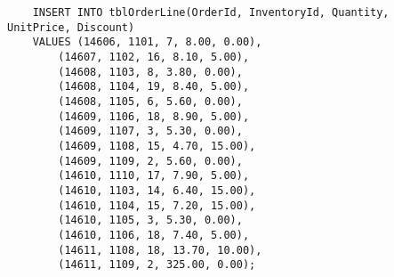 \documentclass[12pt,titlepage]{article}
\begin{document}
\begin{verbatim}
    INSERT INTO tblOrderLine(OrderId, InventoryId, Quantity, UnitPrice, Discount)
    VALUES (14606, 1101, 7, 8.00, 0.00),
        (14607, 1102, 16, 8.10, 5.00),
        (14608, 1103, 8, 3.80, 0.00),
        (14608, 1104, 19, 8.40, 5.00),
        (14608, 1105, 6, 5.60, 0.00),
        (14609, 1106, 18, 8.90, 5.00),
        (14609, 1107, 3, 5.30, 0.00),
        (14609, 1108, 15, 4.70, 15.00),
        (14609, 1109, 2, 5.60, 0.00),
        (14610, 1110, 17, 7.90, 5.00),
        (14610, 1103, 14, 6.40, 15.00),
        (14610, 1104, 15, 7.20, 15.00),
        (14610, 1105, 3, 5.30, 0.00),
        (14610, 1106, 18, 7.40, 5.00),
        (14611, 1108, 18, 13.70, 10.00),
        (14611, 1109, 2, 325.00, 0.00);
\end{verbatim}
\end{document}
